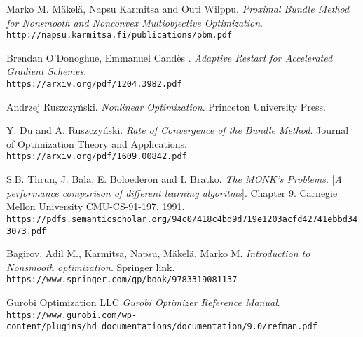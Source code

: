 \begin{thebibliography}{9}
	Marko M. M\"akel\"a, Napsu Karmitsa and Outi Wilppu.
	\textit{Proximal Bundle Method for Nonsmooth and Nonconvex Multiobjective Optimization}.
	\\\texttt{http://napsu.karmitsa.fi/publications/pbm.pdf}
	
	Brendan O’Donoghue, Emmanuel Candès .
	\textit{Adaptive Restart for Accelerated Gradient Schemes}.
	\\\texttt{https://arxiv.org/pdf/1204.3982.pdf}
	
	Andrzej Ruszczyński.
	\textit{Nonlinear Optimization}. Princeton University Press. 
	
	Y. Du and A. Ruszczyński.
	\textit{Rate of Convergence of the Bundle Method}. Journal  of  Optimization Theory and Applications.
	\\\texttt{https://arxiv.org/pdf/1609.00842.pdf}


	S.B. Thrun, J. Bala, E. Boloederon and I. Bratko.
	\textit{The MONK's Problems}. 
	[\textit{A performance comparison of different learning algoritms}]. Chapter 9.
	Carnegie Mellon University CMU-CS-91-197, 1991.
	\\\texttt{https://pdfs.semanticscholar.org/94c0/418c4bd9d719e1203acfd42741ebbd343073.pdf}
	
	 Bagirov, Adil M., Karmitsa, Napsu, Mäkelä, Marko M.
	\textit{Introduction to Nonsmooth optimization}. Springer link.
	\\\texttt{https://www.springer.com/gp/book/9783319081137}	
	
	Gurobi Optimization LLC
	\textit{Gurobi Optimizer Reference Manual}.
	\\\texttt{https://www.gurobi.com/wp-content/plugins/hd\_documentations/documentation/9.0/refman.pdf}	
 

	
\end{thebibliography}
